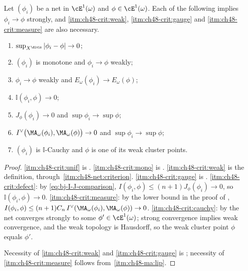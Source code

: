 \begin{proposition}
\label{prop:ch48-criteria}
Let $(\phi_i)$ be a net in $\cE^1(\omega)$ and
$\phi\in\cE^1(\omega)$.  Each of the following implies
$\phi_i\to\phi$ strongly, and \cref{itm:ch48-crit:weak},
\cref{itm:ch48-crit:gauge} and \cref{itm:ch48-crit:measure} are also
necessary.
\begin{enumerate}
\item\label{itm:ch48-crit:unif}
      $\sup_{X^{\divis}}|\phi_i-\phi|\to0$;
\item\label{itm:ch48-crit:mono}
      $(\phi_i)$ is monotone and $\phi_i\to\phi$ weakly;
\item\label{itm:ch48-crit:weak}
      $\phi_i\to\phi$ weakly and $E_\omega(\phi_i)\to E_\omega(\phi)$;
\item\label{itm:ch48-crit:gauge}
      $\mathbb I(\phi_i,\phi)\to0$;
\item\label{itm:ch48-crit:defect}
      $J_\phi(\phi_i)\to0$ and $\sup\phi_i\to\sup\phi$;
\item\label{itm:ch48-crit:measure}
      $I^\vee\bigl(\MA_\omega(\phi_i),\MA_\omega(\phi)\bigr)\to0$ and
      $\sup\phi_i\to\sup\phi$;
\item\label{itm:ch48-crit:cauchy}
      $(\phi_i)$ is $\mathbb I$-Cauchy and $\phi$ is one of its weak
      cluster points.
\end{enumerate}
\end{proposition}

\begin{proof}
\cref{itm:ch48-crit:unif} is .
\cref{itm:ch48-crit:mono} is .
\cref{itm:ch48-crit:weak} is the definition, through
\,\cref{itm:ch48-net:criterion}.
\cref{itm:ch48-crit:gauge} is .
\cref{itm:ch48-crit:defect}: by \eqref{eq:bj-I-J-comparison},
$I(\phi_i,\phi)\le(n+1)J_\phi(\phi_i)\to0$, so
$\mathbb I(\phi_i,\phi)\to0$.
\cref{itm:ch48-crit:measure}: by the lower bound in the proof of
,
$I(\phi_i,\phi)\le(n+1)C_n\,I^\vee(\MA_\omega(\phi_i),\MA_\omega(\phi))
\to0$.
\cref{itm:ch48-crit:cauchy}: by  the net
converges strongly to some $\phi'\in\cE^1(\omega)$; strong convergence
implies weak convergence, and the weak topology is Hausdorff, so the weak
cluster point $\phi$ equals $\phi'$.

Necessity of \cref{itm:ch48-crit:weak} and \cref{itm:ch48-crit:gauge} is
; necessity of
\cref{itm:ch48-crit:measure} follows from
\,\cref{itm:ch48-ma:lip}.
\end{proof}

